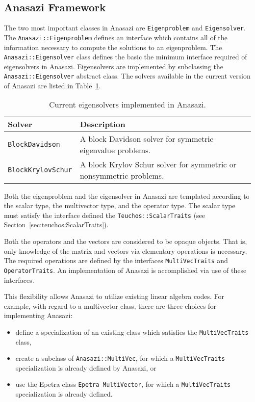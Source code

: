 \subsection{Anasazi Framework}
\label{sec:anasazi:framework}


The two most important classes in Anasazi are \verb!Eigenproblem! and
\verb!Eigensolver!. The \verb!Anasazi::Eigenproblem!  defines an
interface which contains all of the information necessary to compute
the solutions to an eigenproblem. The \verb!Anasazi::Eigensolver!
class defines the basic the minimum interface required of eigensolvers
in Anasazi.  Eigensolvers are implemented by subclassing the
\verb!Anasazi::Eigensolver!  abstract class. The solvers available in
the current version of Anasazi are listed in
Table~\ref{tab:anasazi:solvers}.


\begin{table}[htp]
\begin{center}
\begin{tabular}{| p{4cm} p{8cm} |}
\hline
Solver & Description \\
\hline
{\tt BlockDavidson}    & A block Davidson solver for symmetric
                         eigenvalue problems.\\
{\tt BlockKrylovSchur} & A block Krylov Schur solver for symmetric or
                         nonsymmetric problems.\\
\hline
\end{tabular}
\caption{Current eigensolvers implemented in Anasazi.}
\label{tab:anasazi:solvers}
\end{center}
\end{table}


Both the eigenproblem and the eigensolver in Anasazi are templated
according to the scalar type, the multivector type, and the operator
type. The scalar type must satisfy the interface defined the
\verb!Teuchos::ScalarTraits! (see
Section~\ref{sec:teuchos:ScalarTraits}). 

Both the operators and the vectors are considered to be opaque
objects. That is, only knowledge of the matrix and vectors via
elementary operations is necessary. The required operations are
defined by the interfaces \verb!MultiVecTraits! and
\verb!OperatorTraits!. An implementation of Anasazi is accomplished
via use of these interfaces. 

This flexibility allows Anasazi to utilize existing linear algebra
codes. For example, with regard to a multivector class, there are
three choices for implementing Anasazi:
\begin{itemize}
\item define a specialization of an existing class which satisfies the
\verb!MultiVecTraits! class,
\item create a subclass of \verb!Anasazi::MultiVec!, for which a
\verb!MultiVecTraits! specialization is already defined by Anasazi, or
\item use the Epetra class \verb!Epetra_MultiVector!, for which a
\verb!MultiVecTraits! specialization is already defined.
\end{itemize}

